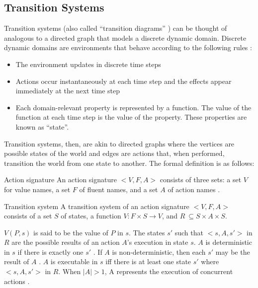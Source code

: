 \subsection{Transition Systems}
\label{subsec:transition_systems}

Transition systems (also called ``transition diagrams'' \cite{blount_architecture_2013}) can be thought of analogous to a directed graph that models a discrete dynamic domain.
Discrete dynamic domains are environments that behave according to the following rules \cite{blount_architecture_2013}:

\begin{itemize}
    \item The environment updates in discrete time steps
    \item Actions occur instantaneously at each time step and the effects appear immediately at the next time step
    \item Each domain-relevant property is represented by a function.
        The value of the function at each time step is the value of the property.
        These properties are known as ``state''.
\end{itemize}

Transition systems, then, are akin to directed graphs where the vertices are possible states of the world and edges are actions that, when performed, transition the world from one state to another.
The formal definition is as follows:

\begin{definition}{Action signature}
    An action signature $ <V,F,A> $ consists of three sets: a set $ V $ for value names, a set $ F $ of fluent names, and a set $ A $ of action names \cite{gelfond_action_1998}.
\end{definition}

\begin{definition}{Transition system}
    A transition system of an action signature $ <V,F,A> $ consists of a set $ S $ of states, a function $ V : F \times S\rightarrow V $, and $ R\ \subseteq S \times A \times S $.
\end{definition}

$ V(P,s) $ is said to be the value of $ P $ in $ s $.
The states $ s' $ such that $ <s, A, s'> $ in $ R $ are the possible results of an action $ A $'s execution in state $ s $.
$ A $ is deterministic in $ s $ if there is exactly one $ s' $ \cite{gelfond_action_1998}.
If $ A $ is non-deterministic, then each $ s' $ may be the result of $ A $ \cite{blount_architecture_2013}.
$ A $ is executable in $ s $ iff there is at least one state $ s' $ where $ <s, A, s'> $ in $ R $.
When $ \left|A\right|>1 $, A represents the execution of concurrent actions \cite{gelfond_action_1998, blount_architecture_2013}.

